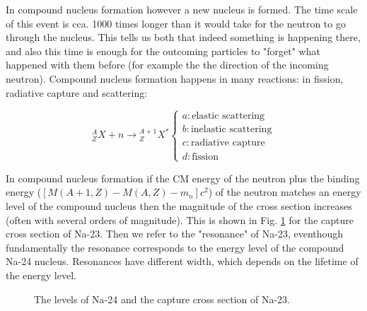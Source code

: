 In compound nucleus formation however a new nucleus is formed. The time scale of this event is cca. 1000 times longer than it would take for the neutron to go through the nucleus. This tells us both that indeed something is happening there, and also this time is enough for the outcoming particles to "forget" what happened with them before (for example the the direction of the incoming neutron). Compound nucleus formation happens in many reactions: in fission, radiative capture and scattering:

\begin{equation}
    {}_Z^AX + n \rightarrow {}_Z^{A+1}X^*
    \begin{cases}
      a: \text{elastic scattering} \\
      b: \text{inelastic scattering} \\
      c: \text{radiative capture} \\
      d: \text{fission}
    \end{cases}
\end{equation}
    
In compound nucleus formation if the CM energy of the neutron plus the binding energy ($[M(A+1,Z)-M(A,Z)-m_n]c^2$) of the neutron matches an energy level of the compound nucleus then the magnitude of the cross section increases (often with several orders of magnitude). This is shown in Fig. \ref{fig:nalevels} for the capture cross section of Na-23. Then we refer to the "resonance" of Na-23, eventhough fundamentally the resonance corresponds to the energy level of the compound Na-24 nucleus. Resonances have different width, which depends on the lifetime of the energy level.

\begin{figure}[ht!]
\protect {}\protect
\caption{\label{fig:nalevels} \footnotesize{The levels of Na-24 and the capture cross section of Na-23.}}
\end{figure}

